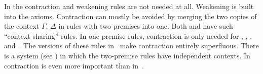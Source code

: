 \documentclass[../../../include/open-logic-section]{subfiles}
\begin{document}
In  the contraction and weakening rules are not needed at
all. Weakening is built into the axioms. Contraction can mostly be
avoided by merging the two copies of the context $\Gamma$, $\Delta$ in
rules with two premises into one. Both  and  have
such ``context sharing'' rules. In one-premise rules, contraction is
only needed for \RightR{\lor}, \LeftR{\land}, \RightR{\lexists},
and~\LeftR{\lforall}. The versions of these rules in~ make
contraction entirely superfluous. There is a system  (see
) in which the two-premise rules have independent
contexts. In  contraction is even more important than
in~.


\end{document}

